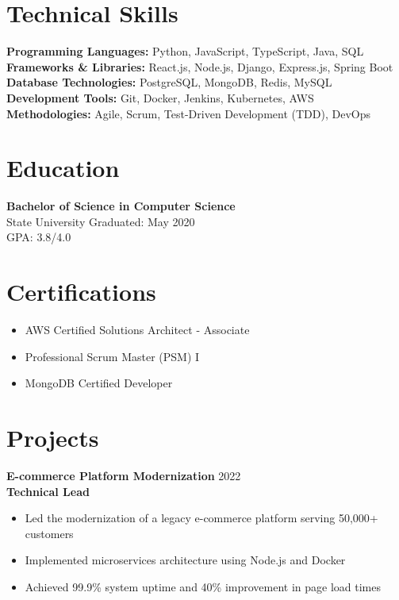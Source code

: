 \documentclass{classic}
\begin{document}
\section{Technical Skills}

\textbf{Programming Languages:} Python, JavaScript, TypeScript, Java, SQL\\
\textbf{Frameworks \& Libraries:} React.js, Node.js, Django, Express.js, Spring Boot\\
\textbf{Database Technologies:} PostgreSQL, MongoDB, Redis, MySQL\\
\textbf{Development Tools:} Git, Docker, Jenkins, Kubernetes, AWS\\
\textbf{Methodologies:} Agile, Scrum, Test-Driven Development (TDD), DevOps

\section{Education}

\textbf{Bachelor of Science in Computer Science}\\
State University \hfill Graduated: May 2020\\
GPA: 3.8/4.0

\section{Certifications}
\begin{itemize}
    \item AWS Certified Solutions Architect - Associate
    \item Professional Scrum Master (PSM) I
    \item MongoDB Certified Developer
\end{itemize}

\section{Projects}

\textbf{E-commerce Platform Modernization} \hfill 2022\\
\textbf{Technical Lead}
\begin{itemize}
    \item Led the modernization of a legacy e-commerce platform serving 50,000+ customers
    \item Implemented microservices architecture using Node.js and Docker
    \item Achieved 99.9\% system uptime and 40\% improvement in page load times
\end{itemize}
\end{document}
